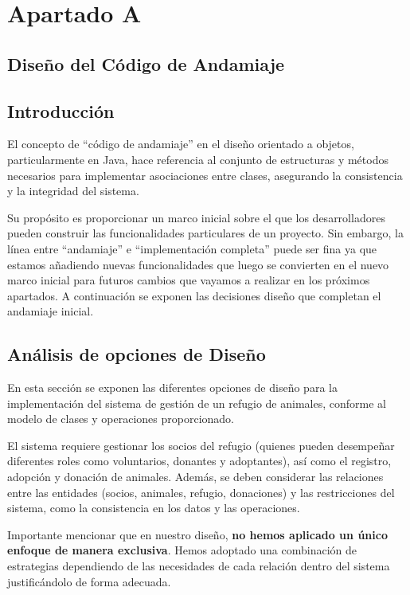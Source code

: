 \section{Apartado A }
\subsection{Diseño del Código de Andamiaje}
\subsection*{Introducción}
El concepto de \enquote{código de andamiaje} en el diseño orientado a objetos, 
particularmente en Java, hace referencia al conjunto de estructuras y métodos 
necesarios para implementar asociaciones entre clases, asegurando la 
consistencia y la integridad del sistema.\par
\vspace{0.15cm}
Su propósito es proporcionar un marco inicial sobre el que los desarrolladores pueden 
construir las funcionalidades particulares de un proyecto. Sin embargo, la línea entre
\enquote{andamiaje} e \enquote{implementación completa} puede ser fina ya que estamos 
añadiendo nuevas funcionalidades que luego se convierten en el nuevo marco inicial para 
futuros cambios que vayamos a realizar en los próximos apartados. A continuación se 
exponen las decisiones diseño que completan el andamiaje inicial.

\subsection{Análisis de opciones de Diseño}
En esta sección se exponen las diferentes opciones de diseño para la implementación 
del sistema de gestión de un refugio de animales, conforme al modelo de clases y 
operaciones proporcionado.\par
\vspace{0.15cm}
El sistema requiere gestionar los socios del refugio (quienes pueden desempeñar 
diferentes roles como voluntarios, donantes y adoptantes), así como el registro, 
adopción y donación de animales. Además, se deben considerar las relaciones entre 
las entidades (socios, animales, refugio, donaciones) y las restricciones del sistema, 
como la consistencia en los datos y las operaciones.\par
\vspace{0.15cm}
Importante mencionar que en nuestro diseño, \textbf{no hemos aplicado un único enfoque de manera 
exclusiva}. Hemos adoptado una combinación de estrategias dependiendo de las necesidades de 
cada relación dentro del sistema justificándolo de forma adecuada.

